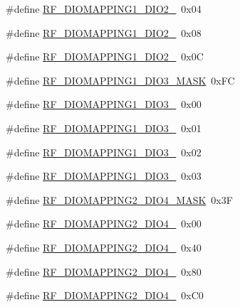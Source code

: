\begin{DoxyCompactItemize}
\item 
\#define \mbox{\hyperlink{sx1276_regs-_fsk_8h_a6f88625f3e51cbfacd0c8328d448fce4}{R\+F\+\_\+\+D\+I\+O\+M\+A\+P\+P\+I\+N\+G1\+\_\+\+D\+I\+O2\+\_}}~0x04
\item 
\#define \mbox{\hyperlink{sx1276_regs-_fsk_8h_ad121efc538b9ec91c270343fc829fb36}{R\+F\+\_\+\+D\+I\+O\+M\+A\+P\+P\+I\+N\+G1\+\_\+\+D\+I\+O2\+\_}}~0x08
\item 
\#define \mbox{\hyperlink{sx1276_regs-_fsk_8h_a8f9393d8018c3a4699ac487c2e133a55}{R\+F\+\_\+\+D\+I\+O\+M\+A\+P\+P\+I\+N\+G1\+\_\+\+D\+I\+O2\+\_}}~0x0C
\item 
\#define \mbox{\hyperlink{sx1276_regs-_fsk_8h_a43ae7365b7ce0d2f75e25cd32c48c6e5}{R\+F\+\_\+\+D\+I\+O\+M\+A\+P\+P\+I\+N\+G1\+\_\+\+D\+I\+O3\+\_\+\+M\+A\+SK}}~0x\+FC
\item 
\#define \mbox{\hyperlink{sx1276_regs-_fsk_8h_ae678538a0f95f5fece5e9bf1e81a5a86}{R\+F\+\_\+\+D\+I\+O\+M\+A\+P\+P\+I\+N\+G1\+\_\+\+D\+I\+O3\+\_}}~0x00
\item 
\#define \mbox{\hyperlink{sx1276_regs-_fsk_8h_a04646c3e0ad7972da0c719126f656a91}{R\+F\+\_\+\+D\+I\+O\+M\+A\+P\+P\+I\+N\+G1\+\_\+\+D\+I\+O3\+\_}}~0x01
\item 
\#define \mbox{\hyperlink{sx1276_regs-_fsk_8h_a950ee75b1c397a6b2f06f2f7269471fe}{R\+F\+\_\+\+D\+I\+O\+M\+A\+P\+P\+I\+N\+G1\+\_\+\+D\+I\+O3\+\_}}~0x02
\item 
\#define \mbox{\hyperlink{sx1276_regs-_fsk_8h_a73c2510210ed9b4605d4fbbadc7e5ed1}{R\+F\+\_\+\+D\+I\+O\+M\+A\+P\+P\+I\+N\+G1\+\_\+\+D\+I\+O3\+\_}}~0x03
\item 
\#define \mbox{\hyperlink{sx1276_regs-_fsk_8h_a9415ebcccf7fd73e9c6e9de0b71a4be8}{R\+F\+\_\+\+D\+I\+O\+M\+A\+P\+P\+I\+N\+G2\+\_\+\+D\+I\+O4\+\_\+\+M\+A\+SK}}~0x3F
\item 
\#define \mbox{\hyperlink{sx1276_regs-_fsk_8h_a2c1e484d67c2b59da0b2b1f4de011000}{R\+F\+\_\+\+D\+I\+O\+M\+A\+P\+P\+I\+N\+G2\+\_\+\+D\+I\+O4\+\_}}~0x00
\item 
\#define \mbox{\hyperlink{sx1276_regs-_fsk_8h_a4ee426f706b74f90c0a6225669a87c6c}{R\+F\+\_\+\+D\+I\+O\+M\+A\+P\+P\+I\+N\+G2\+\_\+\+D\+I\+O4\+\_}}~0x40
\item 
\#define \mbox{\hyperlink{sx1276_regs-_fsk_8h_a6d6eff0baca6f8041d58b483f29c1477}{R\+F\+\_\+\+D\+I\+O\+M\+A\+P\+P\+I\+N\+G2\+\_\+\+D\+I\+O4\+\_}}~0x80
\item 
\#define \mbox{\hyperlink{sx1276_regs-_fsk_8h_a04ef85b93c2ee7e32c2992dbcf60781c}{R\+F\+\_\+\+D\+I\+O\+M\+A\+P\+P\+I\+N\+G2\+\_\+\+D\+I\+O4\+\_}}~0x\+C0

\end{DoxyCompactItemize}
